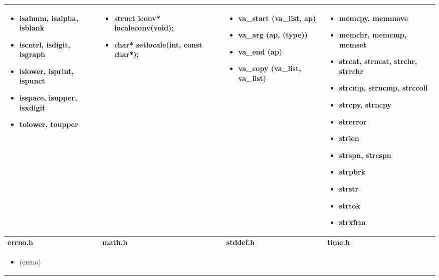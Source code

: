 \begin{table*}[h]
\begin{tabular}{|p{3cm}|p{3cm}|p{3cm}|p{6.5cm}|}
		 \begin{itemize}
\setlength{\itemsep}{0cm}
\setlength{\parskip}{0cm}
	\item isalnum, isalpha, isblank
	\item iscntrl, isdigit, isgraph
	\item islower, isprint, ispunct
	\item isspace, isupper, isxdigit
	\item tolower, toupper
\end{itemize}
 &  \begin{itemize}
\setlength{\itemsep}{0cm}
\setlength{\parskip}{0cm}
	\item struct lconv* localeconv(void);
	\item char* setlocale(int, const char*);
\end{itemize}
 &  \begin{itemize}
\setlength{\itemsep}{0cm}
\setlength{\parskip}{0cm}
	\item va\_start (va\_list, ap)
	\item va\_arg (ap, (type))
	\item va\_end (ap)
	\item va\_copy (va\_list, va\_list)
\end{itemize}
 &  \begin{itemize}
\setlength{\itemsep}{0cm}
\setlength{\parskip}{0cm}
	\item memcpy, memmove
	\item memchr, memcmp, memset
	\item strcat, strncat, strchr, strrchr
	\item strcmp, strncmp, strccoll
	\item strcpy, strncpy
	\item strerror
	\item strlen
	\item strspn, strcspn
	\item strpbrk
	\item strstr
	\item strtok
	\item strxfrm
\end{itemize}
 \\ \hline
		\textbf{ errno.h} & \textbf{ math.h} & \textbf{ stddef.h} & \textbf{ time.h} \\ \hline
		 \begin{itemize}
\setlength{\itemsep}{0cm}
\setlength{\parskip}{0cm}
	\item (errno)
\end{itemize}
 &  \begin{itemize}

\end{itemize}
\end{tabular}
\end{table*}

